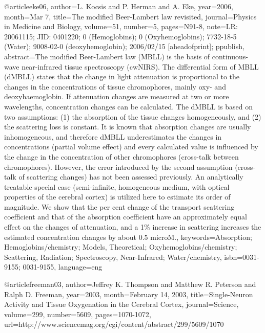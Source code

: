@article{eke06,
	author={L. Kocsis and P. Herman and A. Eke},
	year={2006},
	month={Mar 7},
	title={The modified Beer-Lambert law revisited},
	journal={Physics in Medicine and Biology},
	volume={51},
	number={5},
	pages={N91-8},
	note={LR: 20061115; JID: 0401220; 0 (Hemoglobins); 0 (Oxyhemoglobins); 7732-18-5 (Water); 9008-02-0 (deoxyhemoglobin); 2006/02/15 [aheadofprint]; ppublish},
	abstract={The modified Beer-Lambert law (MBLL) is the basis of continuous-wave near-infrared tissue spectroscopy (cwNIRS). The differential form of MBLL (dMBLL) states that the change in light attenuation is proportional to the changes in the concentrations of tissue chromophores, mainly oxy- and deoxyhaemoglobin. If attenuation changes are measured at two or more wavelengths, concentration changes can be calculated. The dMBLL is based on two assumptions: (1) the absorption of the tissue changes homogeneously, and (2) the scattering loss is constant. It is known that absorption changes are usually inhomogeneous, and therefore dMBLL underestimates the changes in concentrations (partial volume effect) and every calculated value is influenced by the change in the concentration of other chromophores (cross-talk between chromophores). However, the error introduced by the second assumption (cross-talk of scattering changes) has not been assessed previously. An analytically treatable special case (semi-infinite, homogeneous medium, with optical properties of the cerebral cortex) is utilized here to estimate its order of magnitude. We show that the per cent change of the transport scattering coefficient and that of the absorption coefficient have an approximately equal effect on the changes of attenuation, and a 1\% increase in scattering increases the estimated concentration changes by about 0.5 microM.},
	keywords={Absorption; Hemoglobins/chemistry; Models, Theoretical; Oxyhemoglobins/chemistry; Scattering, Radiation; Spectroscopy, Near-Infrared; Water/chemistry},
	isbn={0031-9155; 0031-9155},
	language={eng}
}


@article{freeman03,
	author={Jeffrey K. Thompson and Matthew R. Peterson and Ralph D. Freeman},
	year={2003},
	month={February 14, 2003},
	title={Single-Neuron Activity and Tissue Oxygenation in the Cerebral Cortex},
	journal={Science},
	volume={299},
	number={5609},
	pages={1070-1072},
	url={http://www.sciencemag.org/cgi/content/abstract/299/5609/1070}
}

